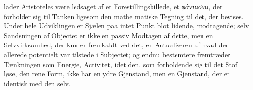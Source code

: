 \documentclass[12pt,a4paper]{book}
\newcommand{\gk}[1]{\textit{#1}}
\begin{document}
lader Aristoteles være ledsaget af et Forestillingsbillede, et
\gk{φάντασμα}, der forholder sig til Tanken ligesom den mathe\-%
matiske Tegning til det, der bevises. Under hele Udviklingen
er Sjælen paa intet Punkt blot lidende, modtagende; selv
Sandsningen af Objectet er ikke en passiv Modtagen af dette,
men en Selvvirksomhed, der kun er fremkaldt ved det, en
Actualiseren af hvad der allerede potentielt var tilstede i
Subjectet; og endnu bestemtere fremtræder Tænkningen som
Energie, Activitet, idet den, som forholdende sig til det Stof\-%
løse, den rene Form, ikke har en ydre Gjenstand, men en
Gjenstand, der er identisk med den selv.
\end{document}
